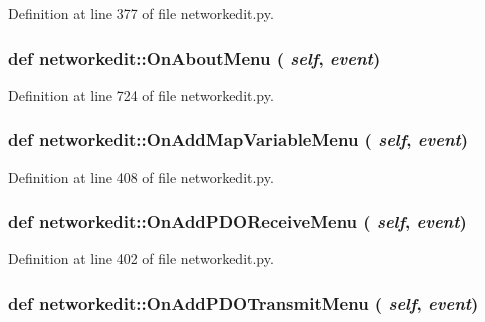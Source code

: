 Definition at line 377 of file networkedit.py.\hypertarget{namespacenetworkedit_c5778c6a10ff341bd15264380d24fa42}{
\subsubsection[OnAboutMenu]{\setlength{\rightskip}{0pt plus 5cm}def networkedit::On\-About\-Menu ( {\em self},  {\em event})}}
\label{namespacenetworkedit_c5778c6a10ff341bd15264380d24fa42}




Definition at line 724 of file networkedit.py.\hypertarget{namespacenetworkedit_0b66d8079bf72006032d854ab966d03c}{
\subsubsection[OnAddMapVariableMenu]{\setlength{\rightskip}{0pt plus 5cm}def networkedit::On\-Add\-Map\-Variable\-Menu ( {\em self},  {\em event})}}
\label{namespacenetworkedit_0b66d8079bf72006032d854ab966d03c}




Definition at line 408 of file networkedit.py.\hypertarget{namespacenetworkedit_d9b96580122ed08bafeedbdea8aea934}{
\subsubsection[OnAddPDOReceiveMenu]{\setlength{\rightskip}{0pt plus 5cm}def networkedit::On\-Add\-PDOReceive\-Menu ( {\em self},  {\em event})}}
\label{namespacenetworkedit_d9b96580122ed08bafeedbdea8aea934}




Definition at line 402 of file networkedit.py.\hypertarget{namespacenetworkedit_ce0a870981c8a339344cefc5d6585033}{
\subsubsection[OnAddPDOTransmitMenu]{\setlength{\rightskip}{0pt plus 5cm}def networkedit::On\-Add\-PDOTransmit\-Menu ( {\em self},  {\em event})}}
\label{namespacenetworkedit_ce0a870981c8a339344cefc5d6585033}





